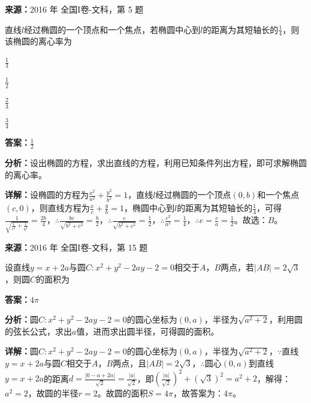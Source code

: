 \begin{question}[points=5]
\textbf{来源：}2016 年 全国I卷-文科，第 5 题\par
直线$l$经过椭圆的一个顶点和一个焦点，若椭圆中心到$l$的距离为其短轴长的$\frac{1}{4}$，则该椭圆的离心率为
\begin{choices}
  \item $\frac{1}{3}$
  \item $\frac{1}{2}$
  \item $\frac{2}{3}$
  \item $\frac{3}{4}$
\end{choices}
\begin{solution}
\textbf{答案：}$\frac{1}{2}$

\textbf{分析：}设出椭圆的方程，求出直线的方程，利用已知条件列出方程，即可求解椭圆的离心率。

\textbf{详解：}设椭圆的方程为$\frac{x^2}{a^2}+\frac{y^2}{b^2}=1$，直线$l$经过椭圆的一个顶点$(0,b)$和一个焦点$(c,0)$，则直线方程为$\frac{x}{c}+\frac{y}{b}=1$，椭圆中心到$l$的距离为其短轴长的$\frac{1}{4}$，可得$\frac{1}{\sqrt{\frac{1}{c^2}+\frac{1}{b^2}}}=\frac{2b}{4}$，$\therefore \frac{bc}{\sqrt{b^2+c^2}}=\frac{b}{2}$，$\therefore \frac{c}{\sqrt{b^2+c^2}}=\frac{1}{2}$，$\therefore \frac{c^2}{a^2}=\frac{1}{4}$，$\therefore e=\frac{c}{a}=\frac{1}{2}$。故选：$B$。
\end{solution}
\end{question}

\begin{question}[points=5]
\textbf{来源：}2016 年 全国I卷-文科，第 15 题\par
设直线$y=x+2a$与圆$C:x^2+y^2-2ay-2=0$相交于$A$，$B$两点，若$|AB|=2\sqrt{3}$，则圆$C$的面积为
\fillin[{$4\pi$}]
\begin{solution}
\textbf{答案：}$4\pi$

\textbf{分析：}圆$C:x^2+y^2-2ay-2=0$的圆心坐标为$(0,a)$，半径为$\sqrt{a^2+2}$，利用圆的弦长公式，求出$a$值，进而求出圆半径，可得圆的面积。

\textbf{详解：}圆$C:x^2+y^2-2ay-2=0$的圆心坐标为$(0,a)$，半径为$\sqrt{a^2+2}$，$\because$直线$y=x+2a$与圆$C$相交于$A$，$B$两点，且$|AB|=2\sqrt{3}$，$\therefore$圆心$(0,a)$到直线$y=x+2a$的距离$d=\frac{|0-a+2a|}{\sqrt{2}}=\frac{|a|}{\sqrt{2}}$，即$(\frac{|a|}{\sqrt{2}})^2+(\sqrt{3})^2=a^2+2$，解得：$a^2=2$，故圆的半径$r=2$。故圆的面积$S=4\pi$，故答案为：$4\pi$。
\end{solution}
\end{question}

